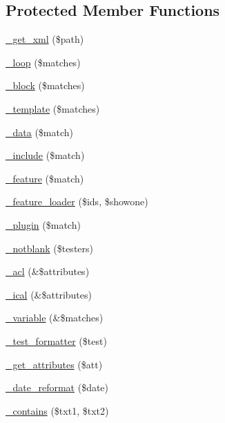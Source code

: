 \subsection*{Protected Member Functions}
\begin{DoxyCompactItemize}
\item 
\hyperlink{classTemplater_a00d40db64ad70c42338c9a59d1de1c35}{\_\-get\_\-xml} (\$path)
\item 
\hyperlink{classTemplater_af19477e936940a697d6cbb90b09de604}{\_\-loop} (\$matches)
\item 
\hyperlink{classTemplater_a9b95e5ef05ebdb894b65e9f235498198}{\_\-block} (\$matches)
\item 
\hyperlink{classTemplater_a232105789c1a17628919135924522406}{\_\-template} (\$matches)
\item 
\hyperlink{classTemplater_afe09ec38c203a7906bfe4dc3de39229e}{\_\-data} (\$match)
\item 
\hyperlink{classTemplater_acb5dac6096e17eb7c7dc1aaab994d8f2}{\_\-include} (\$match)
\item 
\hyperlink{classTemplater_a345b5176475e6002c36ddb34db9d3492}{\_\-feature} (\$match)
\item 
\hyperlink{classTemplater_af7bc1d3618ff46e6a368a3a8a3eb47d7}{\_\-feature\_\-loader} (\$ids, \$showone)
\item 
\hyperlink{classTemplater_a6ea00eab265dfcba5b44ffd1e2836215}{\_\-plugin} (\$match)
\item 
\hyperlink{classTemplater_a421ef5fd3409c14911b123dedb0d569c}{\_\-notblank} (\$testers)
\item 
\hyperlink{classTemplater_af385604071f515718b5a27bd33c7135e}{\_\-acl} (\&\$attributes)
\item 
\hyperlink{classTemplater_a03cce8ddd3c98e958ef5d0887f491085}{\_\-ical} (\&\$attributes)
\item 
\hyperlink{classTemplater_a632a0e87c541dcf981f2cbb59cbd1f53}{\_\-variable} (\&\$matches)
\item 
\hyperlink{classTemplater_ad6f6d3b39173ff8df14c98dff43b2c74}{\_\-test\_\-formatter} (\$test)
\item 
\hyperlink{classTemplater_a28a2d10e85a5b75975e3e62e630c8634}{\_\-get\_\-attributes} (\$att)
\item 
\hyperlink{classTemplater_acc5cc0d5af8280d8fdb51187b5bb5e56}{\_\-date\_\-reformat} (\$date)
\item 
\hyperlink{classTemplater_aa84917bddd2eaa401c9c606311452f84}{\_\-contains} (\$txt1, \$txt2)
\end{DoxyCompactItemize}
